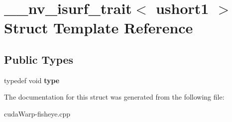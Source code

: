 \hypertarget{struct____nv__isurf__trait_3_01ushort1_01_4}{}\section{\+\_\+\+\_\+nv\+\_\+isurf\+\_\+trait$<$ ushort1 $>$ Struct Template Reference}
\label{struct____nv__isurf__trait_3_01ushort1_01_4}
\subsection*{Public Types}
\begin{DoxyCompactItemize}
\item 
typedef void {\bfseries type}\hypertarget{struct____nv__isurf__trait_3_01ushort1_01_4_aa92c8971561cd652f8325317bed80ec8}{}\label{struct____nv__isurf__trait_3_01ushort1_01_4_aa92c8971561cd652f8325317bed80ec8}

\end{DoxyCompactItemize}


The documentation for this struct was generated from the following file\+:\begin{DoxyCompactItemize}
\item 
cuda\+Warp-\/fisheye.\+cpp\end{DoxyCompactItemize}
